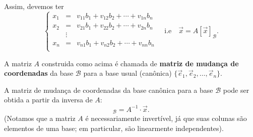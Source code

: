 \documentclass[../livro.tex]{subfiles}  %
\begin{document}
Assim, devemos ter
\begin{equation}
\left\{
\begin{array}{lcl}
x_1 &=& v_{11} b_{1} + v_{12} b_{2} + \cdots + v_{1n} b_{n} \\
x_2 &=& v_{21} b_{1} + v_{22} b_{2} + \cdots + v_{2n} b_{n} \\
&\vdots& \\
x_n &=& v_{n1} b_{1} + v_{n2} b_{2} + \cdots + v_{nn} b_{n} \\
\end{array}
\right. \quad \text{i.e} \quad \vec{x} = A [\vec{x}]_{\mathcal{B}}.
\end{equation}

A matriz $A$ construida como acima é chamada de \textbf{matriz de mudança de coordenadas} da base $\mathcal{B}$ para a base usual (canônica) $\{ \vec{e}_1, \vec{e}_2, \dots, \vec{e}_n\}$.

A matriz de mudança de coordenadas da base canônica para a base $\mathcal{B}$ pode ser obtida a partir da inversa de $A$:
\begin{equation}
[\vec{x}]_{\mathcal{B}} = A^{-1} \cdot \vec{x}.
\end{equation} (Notamos que a matriz $A$ é necessariamente invertível, já que suas colunas são elementos de uma base; em particular, são linearmente independentes).
\end{document}
